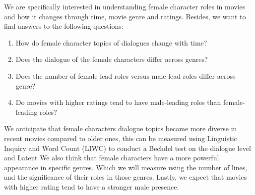 \documentclass[11pt,a4paper]{article}
\begin{document}
We are specifically interested in understanding female character roles in movies and how it changes through time, movie genre and ratings. Besides, we want to find answers to the following questions: 
\begin{enumerate}
    \item How do female character topics of dialogues change with time? 
    \item Does the dialogue of the female characters differ across genres?
    \item Does the number of female lead roles versus male lead roles differ across genre?
    \item Do movies with higher ratings tend to have male-leading roles than female-leading roles? 
\end{enumerate}

We anticipate that female characters dialogue topics became more diverse in recent movies compared to older ones, this can be measured using Linguistic Inquiry and Word Count (LIWC) to conduct a Bechdel test on the dialogue level and Latent We also think that female characters have a more powerful appearance in specific genres. Which we will measure using the number of lines, and the significance of their roles in those genres. Lastly, we expect that movies with higher rating tend to have a stronger male presence.




\end{document}
